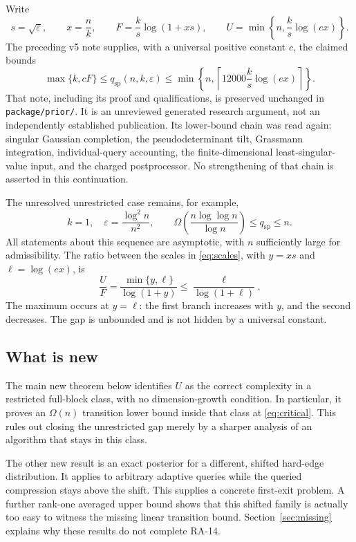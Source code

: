 \documentclass[11pt]{article}
\theoremstyle{definition}
\newcommand{\qsp}{q_{\mathrm{sp}}}
\begin{document}
Write
\begin{equation}\label{eq:scales}
s=\sqrt\varepsilon,\qquad x=\frac nk,\qquad
F=\frac{k}{s}\log(1+xs),\qquad
U=\min\left\{n,\frac{k}{s}\log(ex)\right\}.
\end{equation}
The preceding v5 note supplies, with a universal positive constant $c$, the claimed bounds
\begin{equation}\label{eq:inherited}
\max\{k,cF\}\le\qsp(n,k,\varepsilon)
\le\min\left\{n,\left\lceil12000\frac{k}{s}\log(ex)\right\rceil\right\}.
\end{equation}
That note, including its proof and qualifications, is preserved unchanged in \texttt{package/prior/}. It is an unreviewed generated research argument, not an independently established publication. Its lower-bound chain was read again: singular Gaussian completion, the pseudodeterminant tilt, Grassmann integration, individual-query accounting, the finite-dimensional least-singular-value input, and the charged postprocessor. No strengthening of that chain is asserted in this continuation.

The unresolved unrestricted case remains, for example,
\begin{equation}\label{eq:critical}
k=1,\quad \varepsilon=\frac{\log^2n}{n^2},\qquad
\Omega\!\left(\frac{n\log\log n}{\log n}\right)
\le\qsp\le n.
\end{equation}
All statements about this sequence are asymptotic, with $n$ sufficiently large for admissibility. The ratio between the scales in \eqref{eq:scales}, with $y=xs$ and $\ell=\log(ex)$, is
\begin{equation}\label{eq:ratio}
\frac UF=\frac{\min\{y,\ell\}}{\log(1+y)}
\le\frac{\ell}{\log(1+\ell)}.
\end{equation}
The maximum occurs at $y=\ell$: the first branch increases with $y$, and the second decreases. The gap is unbounded and is not hidden by a universal constant.

\subsection{What is new}
The main new theorem below identifies $U$ as the correct complexity in a restricted full-block class, with no dimension-growth condition. In particular, it proves an $\Omega(n)$ transition lower bound inside that class at \eqref{eq:critical}. This rules out closing the unrestricted gap merely by a sharper analysis of an algorithm that stays in this class.

The other new result is an exact posterior for a different, shifted hard-edge distribution. It applies to arbitrary adaptive queries while the queried compression stays above the shift. This supplies a concrete first-exit problem. A further rank-one averaged upper bound shows that this shifted family is actually too easy to witness the missing linear transition bound. Section~\ref{sec:missing} explains why these results do not complete RA-14.
\end{document}
